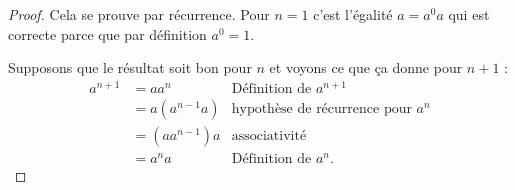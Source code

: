 \begin{proof}
	Cela se prouve par récurrence. Pour \( n=1\) c'est l'égalité \( a=a^0a\) qui est correcte parce que par définition \( a^0=1\).

	Supposons que le résultat soit bon pour \( n\) et voyons ce que ça donne pour \( n+1\) :
	\begin{subequations}
		\begin{align}
			a^{n+1} & =aa^n        & \text{Définition de } a^{n+1}            \\
			        & =a(a^{n-1}a) & \text{hypothèse de récurrence pour } a^n \\
			        & =(aa^{n-1})a & \text{associativité}                     \\
			        & =a^na        & \text{Définition de } a^n.
		\end{align}
	\end{subequations}
\end{proof}
